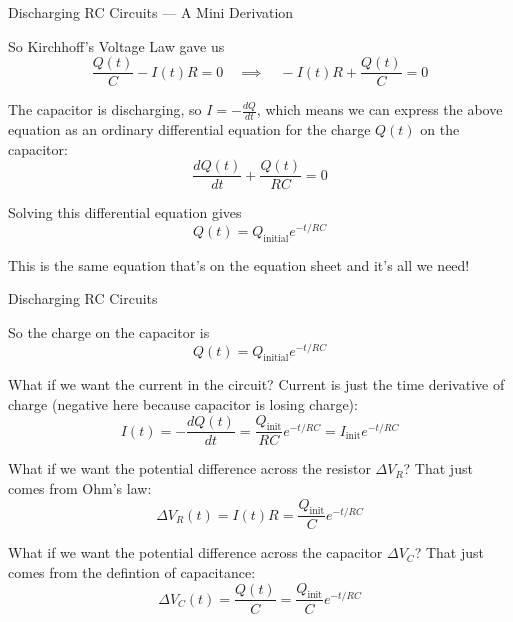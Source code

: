 \documentclass{beamer}
\begin{document}
\begin{frame}{Discharging RC Circuits --- A Mini Derivation}

So Kirchhoff's Voltage Law gave us
\begin{equation*}
    \frac{Q(t)}{C} - I(t) R = 0 \quad \implies \quad -I(t) R + \frac{Q(t)}{C} = 0
\end{equation*}

The capacitor is discharging, so $I=-\frac{dQ}{dt}$, which means we can express the above equation as an ordinary differential equation for the charge $Q(t)$ on the capacitor:
\begin{equation*}
    \frac{dQ(t)}{dt} + \frac{Q(t)}{RC} = 0 
\end{equation*}

Solving this differential equation gives
\begin{equation*}
    \boxed{Q(t) = Q_{\text{initial}} e^{-t/RC}}
\end{equation*}

This is the same equation that's on the equation sheet and it's all we need!

\end{frame}

\begin{frame}{Discharging RC Circuits}

So the charge on the capacitor is
\begin{equation*}
    Q(t) = Q_{\text{initial}} e^{-t/RC}
\end{equation*}

What if we want the current in the circuit? Current is just the time derivative of charge (negative here because capacitor is losing charge):
\begin{equation*}
    I(t) = -\frac{dQ(t)}{dt} = \frac{Q_{\text{init}}}{RC} e^{-t/RC} = I_{\text{init}} e^{-t/RC}
\end{equation*}

What if we want the potential difference across the resistor $\Delta V_R$? That just comes from Ohm's law:
\begin{equation*}
    \Delta V_R (t) = I(t) R = \frac{Q_{\text{init}}}{C} e^{-t/RC}
\end{equation*}

What if we want the potential difference across the capacitor $\Delta V_C$? That just comes from the defintion of capacitance:
\begin{equation*}
    \Delta V_C (t) = \frac{Q(t)}{C} = \frac{Q_{\text{init}}}{C} e^{-t/RC}
\end{equation*}

\end{frame}
\end{document}
